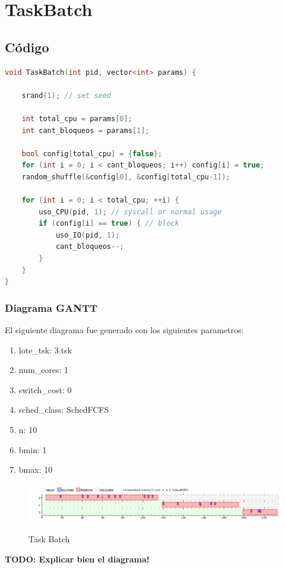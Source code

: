 \section{TaskBatch}

\subsection{Código}

\begin{lstlisting}[language=C++, breaklines=true]
void TaskBatch(int pid, vector<int> params) {

	srand(1); // set seed

	int total_cpu = params[0];
	int cant_bloqueos = params[1];

	bool config[total_cpu] = {false};
	for (int i = 0; i < cant_bloqueos; i++) config[i] = true;
	random_shuffle(&config[0], &config[total_cpu-1]);

	for (int i = 0; i < total_cpu; ++i) {
		uso_CPU(pid, 1); // syscall or normal usage
		if (config[i] == true) { // block
			uso_IO(pid, 1);
			cant_bloqueos--;
		}
	}
}
\end{lstlisting}

\subsubsection{Diagrama GANTT}

El siguiente diagrama fue generado con los siguientes parametros:

\begin{enumerate}
	\item lote\_tsk: 3.tsk
	\item num\_cores: 1
	\item switch\_cost: 0
	\item sched\_class: SchedFCFS
	\item n: 10
	\item bmin: 1
	\item bmax: 10
\end{enumerate}

\begin{figure}[h]
    \includegraphics[width=\linewidth]{images/3.png}
    \label{fig:Task Consola}
    \caption{Task Batch}
\end{figure}

\textbf{TODO: Explicar bien el diagrama!}